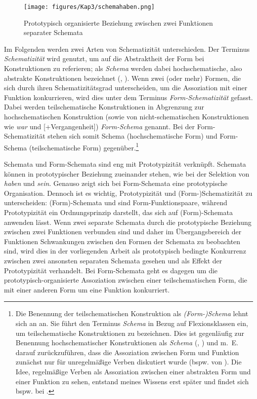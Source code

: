 \begin{figure}
\texttt{[image: figures/Kap3/schemahaben.png]}
\caption{Prototypisch organisierte Beziehung zwischen zwei Funktionen separater Schemata}
\label{schemahaben}
\end{figure} 


Im Folgenden werden zwei Arten von Schematizität unterschieden. Der Terminus \textit{Schematizität} wird genutzt, um auf die Abstraktheit der Form bei Konstruktionen zu referieren; als \textit{Schema} werden dabei hochschematische, also abstrakte Konstruktionen bezeichnet (\cite[5]{Booij.2010}, \cite[80]{Bybee.2010}).  Wenn zwei (oder mehr) Formen, die sich durch ihren Schematizitätsgrad unterscheiden, um die Assoziation mit einer Funktion konkurrieren, wird dies unter dem Terminus \textit{Form-Schematizität} gefasst. Dabei werden teilschematische Konstruktionen in Abgrenzung zur hochschematischen Konstruktion (sowie von nicht-schematischen Konstruktionen wie \textit{war} und [+Vergangenheit]) \textit{Form-Schema} genannt. Bei der Form-Schematizität stehen sich somit Schema (hochschematische Form) und Form-Schema (teilschematische Form) gegenüber.\footnote{Die Benennung der teilschematischen Konstruktion als \textit{(Form-)Schema} lehnt sich an \textcite[129]{Bybee.1985} an. Sie führt den Terminus \textit{Schema} in Bezug auf Flexionsklassen ein, um teilschematische Konstruktionen zu bezeichnen. Dies ist gegenläufig zur Benennung hochschematischer Konstruktionen als \textit{Schema}  (\cite[5]{Booij.2010}, \cite[80]{Bybee.2010}) und m.~E. darauf zurückzuführen, dass die Assoziation zwischen Form und Funktion zunächst nur für unregelmäßige Verben diskutiert wurde (bspw. von \cite{Bybee.1983}). Die Idee, regelmäßige Verben als Assoziation zwischen einer abstrakten Form und einer Funktion zu sehen, entstand meines Wissens erst später und findet sich bspw. bei \textcite[86]{Bybee.1991}.}   


Schemata und Form-Schemata sind eng mit Prototypizität verknüpft. Schemata können in prototypischer Beziehung zueinander stehen, wie bei der Selektion von \textit{haben} und \textit{sein}. Genauso  zeigt sich bei Form-Schemata eine prototypische Organisation. Dennoch ist es wichtig, Prototypizität und (Form-)Schematizität zu unterscheiden: (Form)-Schemata und sind Form-Funktionspaare, während Prototypizität ein Ordnungsprinzip darstellt, das sich auf (Form)-Schemata anwenden lässt. Wenn zwei separate Schemata durch die prototypische Beziehung zwischen zwei Funktionen verbunden sind und daher im Übergangsbereich der Funktionen Schwankungen zwischen den Formen der Schemata zu beobachten sind, wird dies in der vorliegenden Arbeit als prototypisch bedingte Konkurrenz zwischen zwei ansonsten separaten Schemata gesehen und als Effekt der Prototypizität verhandelt. Bei Form-Schemata geht es dagegen um die prototypisch-organisierte Assoziation zwischen einer teilschematischen Form, die mit einer anderen Form um eine Funktion konkurriert. 

